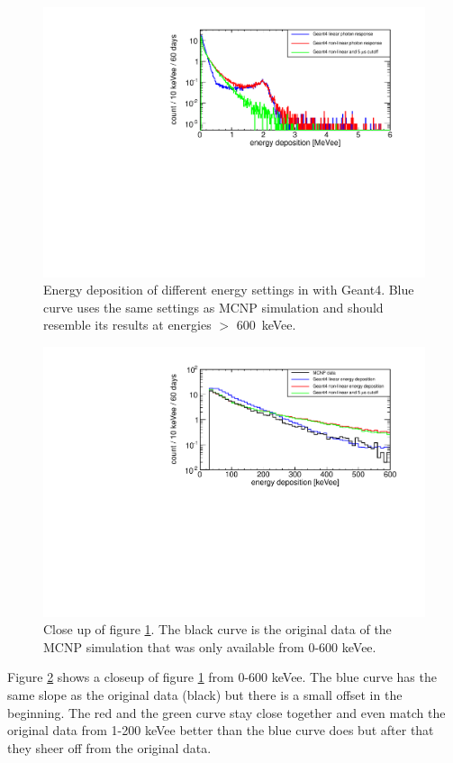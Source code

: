 \documentclass[12pt]{article}
\begin{document}
 \begin{figure}[H]
 	\centering
 		\includegraphics[width=1.\textwidth]{pics/edep_full.pdf}
 		\caption{Energy deposition of different energy settings in with Geant4. Blue curve uses the same settings as MCNP simulation and should resemble its results at energies $>$ \SI{600}{keVee}.}
 		\label{fig:edepFull}
\end{figure}
\begin{figure}[H]
	\centering
 		\includegraphics[width=1.\textwidth]{pics/edep_small.pdf}
 		\caption{Close up of figure \ref{fig:edepFull}. The black curve is the original data of the MCNP simulation that was only available from {0-600} {keVee}.}
 		\label{fig:edepSmall}
 	\end{figure} 
 	
 Figure \ref{fig:edepSmall} shows a closeup of figure \ref{fig:edepFull} from 0-600 keVee. The blue curve has the same slope as the original data (black) but there is a small offset in the beginning.
 The red and the green curve stay close together and even match the original data from 1-200 keVee better than the blue curve does but after that they sheer off from the original data.
 
\end{document}
